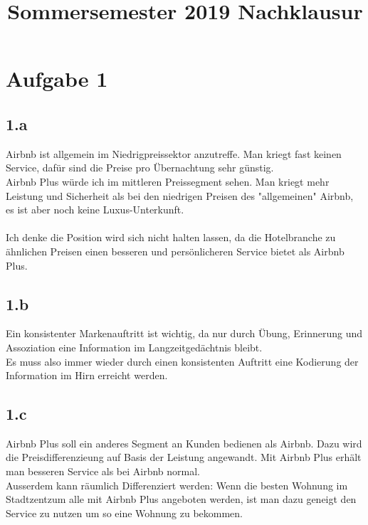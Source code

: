 


\title{Sommersemester 2019 Nachklausur}
\maketitle



\section{Aufgabe 1}
\subsection{1.a}
    Airbnb ist allgemein im Niedrigpreissektor anzutreffe. Man kriegt fast keinen Service, dafür sind die Preise pro Übernachtung sehr günstig. \\
    Airbnb Plus würde ich im mittleren Preissegment sehen. Man kriegt mehr Leistung und Sicherheit als bei den niedrigen Preisen des "allgemeinen" Airbnb, es ist aber noch keine Luxus-Unterkunft. \\
    \ \\
    Ich denke die Position wird sich nicht halten lassen, da die Hotelbranche zu ähnlichen Preisen einen besseren und persönlicheren Service bietet als Airbnb Plus. \\

\subsection{1.b}
    Ein konsistenter Markenauftritt ist wichtig, da nur durch Übung, Erinnerung und Assoziation eine Information im Langzeitgedächtnis bleibt. \\
    Es muss also immer wieder durch einen konsistenten Auftritt eine Kodierung der Information im Hirn erreicht werden.

\subsection{1.c}
    Airbnb Plus soll ein anderes Segment an Kunden bedienen als Airbnb. Dazu wird die Preisdifferenzieung auf Basis der Leistung angewandt. Mit Airbnb Plus erhält man besseren Service als bei Airbnb normal. \\
    Ausserdem kann räumlich Differenziert werden: Wenn die besten Wohnung im Stadtzentzum alle mit Airbnb Plus angeboten werden, ist man dazu geneigt den Service zu nutzen um so eine Wohnung zu bekommen.

